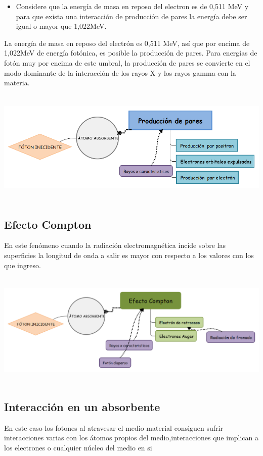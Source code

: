 \documentclass[12pt,fleqn]{book} %
\numberwithin{equation}{section} %
\numberwithin{figure}{section} %
\numberwithin{table}{section} %
\begin{document}
\begin{itemize}
 \item Considere que la energía de masa en reposo del electron es de 0,511 MeV y para que exista una interacción de producción de pares la energía debe ser igual o mayor que 1,022MeV.
\end{itemize}


La energía de masa en reposo del electrón es 0,511 MeV, así que por encima de 1,022MeV de energía fotónica, es posible la producción de pares. Para energías de fotón muy por encima de este umbral, la producción de pares se convierte en el modo dominante de la interacción de los rayos X y los rayos gamma con la materia.
\begin{center}
\includegraphics[height=5.5cm]{pr}
\end{center}


\subsection*{Efecto Compton }
En este fenómeno cuando la radiación electromagnética incide sobre las superficies la longitud de onda a salir es mayor con respecto a los valores con los que ingreso.

\begin{center}
\includegraphics[height=5.5cm]{com}
\end{center}

\subsection{Interacción en un absorbente} 
En este caso los fotones al atravesar el medio material consiguen sufrir interacciones varias con los átomos propios del medio,interacciones que implican a los electrones o cualquier núcleo del medio en si
\end{document}
